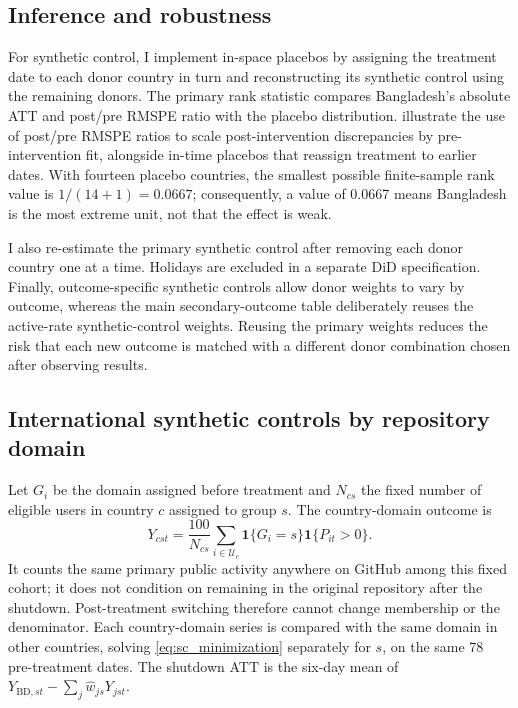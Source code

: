 \subsection{Inference and robustness}
\label{sec:inference}

For synthetic control, I implement in-space placebos by assigning the treatment date to each donor country in turn and reconstructing its synthetic control using the remaining donors. The primary rank statistic compares Bangladesh's absolute ATT and post/pre RMSPE ratio with the placebo distribution. \citet*{abadie2015} illustrate the use of post/pre RMSPE ratios to scale post-intervention discrepancies by pre-intervention fit, alongside in-time placebos that reassign treatment to earlier dates. With fourteen placebo countries, the smallest possible finite-sample rank value is $1/(14+1) = 0.0667$; consequently, a value of 0.0667 means Bangladesh is the most extreme unit, not that the effect is weak.

I also re-estimate the primary synthetic control after removing each donor country one at a time. Holidays are excluded in a separate DiD specification. Finally, outcome-specific synthetic controls allow donor weights to vary by outcome, whereas the main secondary-outcome table deliberately reuses the active-rate synthetic-control weights. Reusing the primary weights reduces the risk that each new outcome is matched with a different donor combination chosen after observing results.


\subsection{International synthetic controls by repository domain}
\label{sec:sector_sc_method}

Let $G_i$ be the domain assigned before treatment and $N_{cs}$ the fixed number of eligible users in country $c$ assigned to group $s$. The country-domain outcome is
\begin{equation}
 Y_{cst}=\frac{100}{N_{cs}}\sum_{i\in\mathcal U_c}\mathbf1\{G_i=s\}\mathbf1\{P_{it}>0\}.
 \label{eq:sector_cohort}
\end{equation}
It counts the same primary public activity anywhere on GitHub among this fixed cohort; it does not condition on remaining in the original repository after the shutdown. Post-treatment switching therefore cannot change membership or the denominator. Each country-domain series is compared with the same domain in other countries, solving \cref{eq:sc_minimization} separately for $s$, on the same 78 pre-treatment dates. The shutdown ATT is the six-day mean of $Y_{\mathrm{BD},st}-\sum_j\widehat w_{js}Y_{jst}$.

